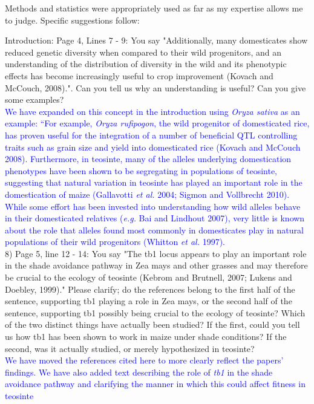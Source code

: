 \documentclass[11pt]{article}
\newcommand{\res}[1]{\noindent \textcolor{blue}{{#1}} \\}
\begin{document}
Methods and statistics were appropriately used as far as my expertise allows me to judge.
Specific suggestions follow:

Introduction:
Page 4, Lines 7 - 9: You say "Additionally, many domesticates show reduced genetic diversity when compared to their wild progenitors, and an understanding of the distribution of diversity in the wild and its phenotypic eﬀects has become increasingly useful to crop improvement (Kovach and McCouch, 2008).".  Can you tell us why an understanding is useful? Can you give some examples?\\

\res{We have expanded on this concept in the introduction using \emph{Oryza sativa} as an example: ``For example, \emph{Oryza rufipogon}, the wild progenitor of domesticated rice, has proven useful for the integration of a number of beneficial QTL controlling traits such as grain size and yield into domesticated rice (Kovach and McCouch 2008). Furthermore, in teosinte, many of the alleles underlying domestication phenotypes have been shown to be segregating in populations of teosinte, suggesting that natural variation in teosinte has played an important role in the domestication of maize (Gallavotti \emph{et al.} 2004; Sigmon and Vollbrecht 2010). While some effort has been invested into understanding how wild alleles behave in their domesticated relatives (\emph{e.g.} Bai and Lindhout 2007), very little is known about the role that alleles found most commonly in domesticates play in natural populations of their wild progenitors (Whitton \emph{et al.} 1997).}

8) Page 5, line 12 - 14: You say "The tb1 locus appears to play an important role in the shade avoidance pathway in Zea mays and other grasses and may therefore be crucial to the ecology of teosinte (Kebrom and Brutnell, 2007; Lukens and Doebley, 1999)." Please clarify; do the references belong to the first half of the sentence, supporting tb1 playing a role in Zea mays, or the second half of the sentence, supporting tb1 possibly being crucial to the ecology of teosinte? Which of the two distinct things have actually been studied? If the first, could you tell us how tb1 has been shown to work in maize under shade conditions? If the second, was it actually studied, or merely hypothesized in teosinte?\\ 

\res{We have moved the references cited here to more clearly reflect the papers' findings.  We have also added text describing the role of \emph{tb1} in the shade avoidance pathway and clarifying the manner in which this could affect fitness in teosinte}
\end{document}
